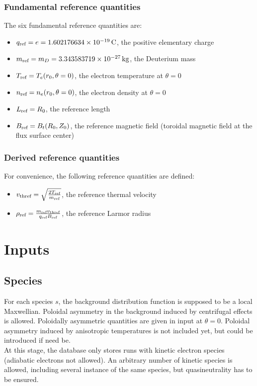 \documentclass[a4paper]{report}
\begin{document}
\subsection{Fundamental reference quantities}
The six fundamental reference quantities are:
\begin{itemize}
\item $q_{\textrm{ref}}=e=1.602176634\times10^{-19}\,\textrm{C}$, the positive elementary charge
\item $m_{\textrm{ref}}=m_D=3.343583719\times10^{-27}\,\textrm{kg}$, the Deuterium mass
\item $T_{\textrm{ref}}=T_e(r_0,\theta=0)$, the electron temperature at $\theta=0$
\item $n_{\textrm{ref}}=n_e(r_0,\theta=0)$, the electron density at $\theta=0$
\item $L_{\textrm{ref}}=R_0$, the reference length
\item $B_{\textrm{ref}}=B_t(R_0,Z_0)$, the reference magnetic field (toroidal magnetic field at the flux surface center)
\end{itemize}

\subsection{Derived reference quantities}
For convenience, the following reference quantities are defined:
\begin{itemize}
\item $v_\textrm{thref}=\sqrt{\frac{2T_{\textrm{ref}}}{m_{\textrm{ref}}}}$, the reference thermal velocity
\item $\rho_{\textrm{ref}} = \frac{m_{\textrm{ref}} v_\textrm{thref}}{q_{\textrm{ref}} B_{\textrm{ref}}}$, the reference Larmor radius
\end{itemize}


\chapter{Inputs}
\section{Species}
For each species $s$, the background distribution function is supposed to be a local Maxwellian. Poloidal asymmetry in the background induced by centrifugal effects is allowed. Poloidally asymmetric quantities are given in input at $\theta=0$. Poloidal asymmetry induced by anisotropic temperatures is not included yet, but could be introduced if need be.\\ 
At this stage, the database only stores runs with kinetic electron species (adiabatic electrons not allowed). An arbitrary number of kinetic species is allowed, including several instance of the same species, but quasineutrality has to be ensured.
\end{document}
